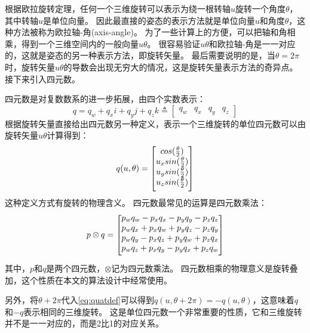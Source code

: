 \documentclass[
  type=master
]{gdutthesis}
\begin{document}
根据欧拉旋转定理，任何一个三维旋转可以表示为绕一根转轴$u$旋转一个角度$\theta$，其中转轴$u$是单位向量\cite{palais2007euler}。
因此最直接的姿态的表示方法就是单位向量$u$和角度$\theta$，这种方法被称为欧拉轴-角(axis-angle)。
为了一些计算上的方便，可以把轴和角相乘，得到一个三维空间内的一般向量$u\theta$。
很容易验证$u\theta$和欧拉轴-角是一一对应的，这就是姿态的另一种表示方法，即旋转矢量。
最后需要说明的是，当$\theta = 2\pi$时，旋转矢量$u\theta$的导数会出现无穷大的情况，这是旋转矢量表示方法的奇异点。
接下来引入四元数。

四元数是对复数数系的进一步拓展，由四个实数表示：
\begin{equation}\label{eq:quatdef1}
	q = q_w + q_x i + q_y j + q_z k \triangleq 
		\begin{bmatrix}
			q_w & q_x & q_y & q_z
		\end{bmatrix}
\end{equation}
根据旋转矢量直接给出四元数另一种定义，表示一个三维旋转的单位四元数可以由旋转矢量$u\theta$计算得到：
\begin{equation}\label{eq:quatdef}
	q(u,\theta) = 
	\begin{bmatrix}
		cos(\frac{\theta}{2}) \\
		u_x sin(\frac{\theta}{2}) \\
		u_y sin(\frac{\theta}{2}) \\
		u_z sin(\frac{\theta}{2})\vspace{1ex}
	\end{bmatrix}	
\end{equation}
\vspace{1ex}这种定义方式有旋转的物理含义。
四元数最常见的运算是四元数乘法：
\begin{equation}
	p \otimes q = 
	\begin{bmatrix}
		p_w q_w - p_x q_x - p_y q_y - p_z q_z \\
		p_w q_x + p_x q_w + p_y q_z - p_z q_y \\
		p_w q_y - p_x q_z + p_y q_w + p_z q_x \\
		p_w q_z + p_x q_y - p_y q_x + p_z q_w \vspace{1ex}
	\end{bmatrix}	
\end{equation}
其中，$p$和$q$是两个四元数，$\otimes$记为四元数乘法。
四元数相乘的物理意义是旋转叠加，这个性质在本文的算法设计中经常使用。

另外，将$\theta + 2\pi$代入\autoref{eq:quatdef}可以得到$q(u,\theta + 2\pi)=-q(u,\theta)$，这意味着$q$和$-q$表示相同的三维旋转。
这是单位四元数一个非常重要的性质，它和三维旋转并不是一一对应的，而是2比1的对应关系。
\end{document}
